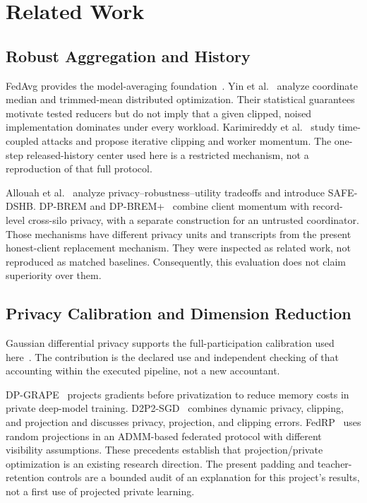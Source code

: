 \documentclass[conference,letterpaper]{IEEEtran}
\begin{document}
\section{Related Work}
\subsection{Robust Aggregation and History}
FedAvg provides the model-averaging foundation~\cite{fedavg}. Yin et al.~\cite{yin} analyze coordinate median and trimmed-mean distributed optimization. Their statistical guarantees motivate tested reducers but do not imply that a given clipped, noised implementation dominates under every workload. Karimireddy et al.~\cite{history} study time-coupled attacks and propose iterative clipping and worker momentum. The one-step released-history center used here is a restricted mechanism, not a reproduction of that full protocol.

Allouah et al.~\cite{trilemma} analyze privacy--robustness--utility tradeoffs and introduce SAFE-DSHB. DP-BREM and DP-BREM+~\cite{dpbrem} combine client momentum with record-level cross-silo privacy, with a separate construction for an untrusted coordinator. Those mechanisms have different privacy units and transcripts from the present honest-client replacement mechanism. They were inspected as related work, not reproduced as matched baselines. Consequently, this evaluation does not claim superiority over them.

\subsection{Privacy Calibration and Dimension Reduction}
Gaussian differential privacy supports the full-participation calibration used here~\cite{gdp}. The contribution is the declared use and independent checking of that accounting within the executed pipeline, not a new accountant.

DP-GRAPE~\cite{dpgrape} projects gradients before privatization to reduce memory costs in private deep-model training. D2P2-SGD~\cite{d2p2} combines dynamic privacy, clipping, and projection and discusses privacy, projection, and clipping errors. FedRP~\cite{fedrp} uses random projections in an ADMM-based federated protocol with different visibility assumptions. These precedents establish that projection/private optimization is an existing research direction. The present padding and teacher-retention controls are a bounded audit of an explanation for this project's results, not a first use of projected private learning.
\end{document}
